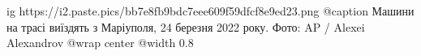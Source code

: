  
 
 
 
 

\ifcmt
  ig https://i2.paste.pics/bb7e8fb9bdc7eee609f59dfcf8e9ed23.png
	@caption Машини на трасі виїздять з Маріуполя, 24 березня 2022 року. Фото: AP / Alexei Alexandrov
  @wrap center
  @width 0.8
\fi
